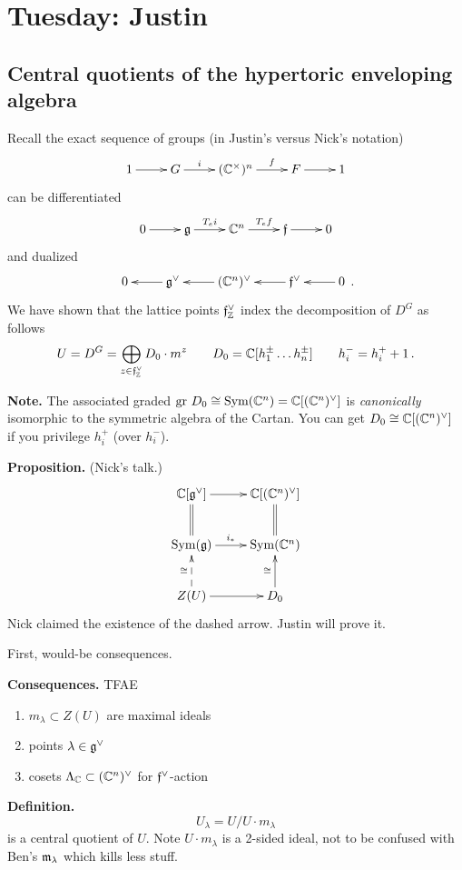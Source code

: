 \newpage 

\section{Tuesday: Justin}

\subsection{Central quotients of the hypertoric enveloping algebra}

Recall the exact sequence of groups (in Justin's versus Nick's notation) 
\[
    \xymatrix{1 \ar[r] & G \ar[r]^-{i} & (\C^\times)^n \ar[r]^-{f} & F \ar[r] & 1 } 
\]
can be differentiated 
\[
    \xymatrix{0 \ar[r] & \g \ar[r]^-{T_ei} & \C^n \ar[r]^-{T_e f} & \ff \ar[r] & 0 } 
\]
and dualized 
\[
    \xymatrix{0 & \g^\vee \ar[l] & (\C^n)^\vee \ar[l] & \ff^\vee \ar[l] & 0 \ar[l] }\,.
\]
We have shown that the lattice points $\mathfrak{f}^\vee_{\mathbb{Z}}$ index the decomposition of $D^G$ as follows
\[
    U = D^G = \bigoplus_{z \in \mathfrak{f}_{\mathbb{Z}}^\vee} D_0 \cdot m^z \qquad D_0 = \mathbb{C}[h_1^\pm \ldots h_n^\pm] \qquad h_i^- = h_i^+ + 1\,.
\]

\textbf{Note.} The associated graded ${\rm gr ~} D_0 \cong {\rm Sym } (\mathbb{C}^n) = \mathbb{C}[(\mathbb{C}^n)^\vee]$ is \textit{canonically} isomorphic to the symmetric algebra of the Cartan. You can get $D_0\cong \mathbb{C}[(\mathbb{C}^n)^\vee]$ if you privilege $h_i^+$ (over $h_i^-$). 

\textbf{Proposition.} (Nick's talk.) 
\[
\xymatrix{
    \C[\g^\vee] \ar[r] \ar@{=}[d] & \C[(\C^n)^\vee] \ar@{=}[d] \\
    \Sym(\g) \ar[r]^-{i_\ast} & \Sym(\C^n) \\
    Z(U) \ar@{-->}[u]^{\cong} \ar[r] & D_0\ar[u]^{\cong} 
}    
\]
Nick claimed the existence of the dashed arrow. Justin will prove it. 

First, would-be consequences. 

\textbf{Consequences.} TFAE 
\begin{enumerate}
    \item $m_\lambda \subset Z(U)$ are maximal ideals
    \item points $\lambda\in \mathfrak{g}^\vee$ 
    \item cosets $\Lambda_{\mathbb{C}}\subset (\mathbb{C}^n)^\vee$ for $\mathfrak{f}^\vee$-action  
\end{enumerate}

\textbf{Definition.} \[ U_\lambda = U/U\cdot m_\lambda \] is a central quotient of $U$. Note $U\cdot m_\lambda$ is a 2-sided ideal, not to be confused with Ben's $\mathfrak{m}_\lambda$ which kills less stuff. 

